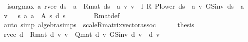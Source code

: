 \begin{isabellebody}
\ {\isacharasterisk}{\kern0pt}{\isacharasterisk}{\kern0pt}{\isacharcolon}{\kern0pt}\ {\isachardoublequoteopen}is{\isacharunderscore}{\kern0pt}arg{\isacharunderscore}{\kern0pt}max\ {\isacharparenleft}{\kern0pt}{\isasymlambda}a{\isachardot}{\kern0pt}\ {\isacharparenleft}{\kern0pt}{\isacharparenleft}{\kern0pt}r{\isacharunderscore}{\kern0pt}vec\ {\isacharparenleft}{\kern0pt}d{\isacharparenleft}{\kern0pt}s\ {\isacharcolon}{\kern0pt}{\isacharequal}{\kern0pt}\ a{\isacharparenright}{\kern0pt}{\isacharparenright}{\kern0pt}\ {\isacharplus}{\kern0pt}\ R{\isacharunderscore}{\kern0pt}mat\ {\isacharparenleft}{\kern0pt}d{\isacharparenleft}{\kern0pt}s\ {\isacharcolon}{\kern0pt}{\isacharequal}{\kern0pt}\ a{\isacharparenright}{\kern0pt}{\isacharparenright}{\kern0pt}\ {\isacharasterisk}{\kern0pt}v\ v{\isacharparenright}{\kern0pt}\ {\isacharplus}{\kern0pt}\ {\isacharparenleft}{\kern0pt}{\isacharparenleft}{\kern0pt}l\ {\isacharasterisk}{\kern0pt}\isactrlsub R\ P{\isacharunderscore}{\kern0pt}lower\ {\isacharparenleft}{\kern0pt}d{\isacharparenleft}{\kern0pt}s\ {\isacharcolon}{\kern0pt}{\isacharequal}{\kern0pt}\ a{\isacharparenright}{\kern0pt}{\isacharparenright}{\kern0pt}{\isacharparenright}{\kern0pt}\ {\isacharasterisk}{\kern0pt}v\ GS{\isacharunderscore}{\kern0pt}inv\ {\isacharparenleft}{\kern0pt}d{\isacharparenleft}{\kern0pt}s\ {\isacharcolon}{\kern0pt}{\isacharequal}{\kern0pt}\ a{\isacharparenright}{\kern0pt}{\isacharparenright}{\kern0pt}\ v{\isacharparenright}{\kern0pt}\ {\isacharparenright}{\kern0pt}\ {\isachardollar}{\kern0pt}\ s{\isacharparenright}{\kern0pt}\ {\isacharparenleft}{\kern0pt}{\isasymlambda}a{\isachardot}{\kern0pt}\ a\ {\isasymin}\ A\ s{\isacharparenright}{\kern0pt}\ {\isacharparenleft}{\kern0pt}d\ s{\isacharparenright}{\kern0pt}{\isachardoublequoteclose}\isanewline
\ \ \ \ \ \ \isamarkupfalse%
\ R{\isacharunderscore}{\kern0pt}mat{\isacharunderscore}{\kern0pt}def\isanewline
\ \ \ \ \ \ \isamarkupfalse%
\ {\isacharparenleft}{\kern0pt}auto\ simp{\isacharcolon}{\kern0pt}\ algebra{\isacharunderscore}{\kern0pt}simps\ \ scaleR{\isacharunderscore}{\kern0pt}matrix{\isacharunderscore}{\kern0pt}vector{\isacharunderscore}{\kern0pt}assoc{\isacharparenright}{\kern0pt}\isanewline
\ \ \ \ \isamarkupfalse%
\ {\isacharquery}{\kern0pt}thesis\isanewline
\ \ \ \ \isamarkupfalse%
{\isacharminus}{\kern0pt}\ \isanewline
\ \ \ \ \ \ \isamarkupfalse%
\ {\isachardoublequoteopen}{\isacharparenleft}{\kern0pt}r{\isacharunderscore}{\kern0pt}vec\ d\ {\isacharplus}{\kern0pt}\ R{\isacharunderscore}{\kern0pt}mat\ d\ {\isacharasterisk}{\kern0pt}v\ v{\isacharparenright}{\kern0pt}\ {\isacharequal}{\kern0pt}\ Q{\isacharunderscore}{\kern0pt}mat\ d\ {\isacharasterisk}{\kern0pt}v\ {\isacharparenleft}{\kern0pt}GS{\isacharunderscore}{\kern0pt}inv\ d\ v{\isacharparenright}{\kern0pt}{\isachardoublequoteclose}\ \ d\ v\isanewline

\end{isabellebody}

